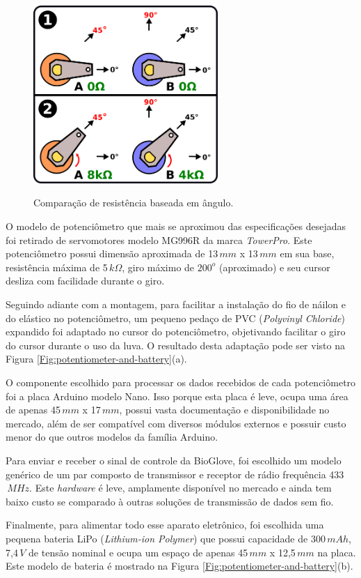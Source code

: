 \documentclass[
	12pt,				%
	openright,			%
	oneside,			%
	a4paper,			%
	english,			%
	brazil				%
	]{abntex2}
\begin{document}
		\begin{figure}[h!]
			\centering
			\caption{Comparação de resistência baseada em ângulo.}
  		\includegraphics[width=7cm]{./figures/pot-comparison.png}
  		\label{Fig:pot-comparison}
		\end{figure}
			
			O modelo de potenciômetro que mais se aproximou das especificações desejadas foi retirado de servomotores modelo MG996R da marca \textit{TowerPro}. Este potenciômetro possui dimensão aproximada de 13$\,mm$ x 13$\,mm$ em sua base, resistência máxima de 5$\,k\Omega$, giro máximo de $200^{o}$ (aproximado) e seu cursor desliza com facilidade durante o giro. 

			Seguindo adiante com a montagem, para facilitar a instalação do fio de náilon e do elástico no potenciômetro, um pequeno pedaço de PVC (\textit{Polyvinyl Chloride}) expandido foi adaptado no cursor do potenciômetro, objetivando facilitar o giro do cursor durante o uso da luva. O resultado desta adaptação pode ser visto na Figura \ref{Fig:potentiometer-and-battery}(a).

			O componente escolhido para processar os dados recebidos de cada potenciômetro foi a placa Arduino modelo Nano. Isso porque esta placa é leve, ocupa uma área de apenas 45$\,mm$ x 17$\,mm$, possui vasta documentação e disponibilidade no mercado, além de ser compatível com diversos módulos externos e possuir custo menor do que outros modelos da família Arduino.

			Para enviar e receber o sinal de controle da BioGlove, foi escolhido um modelo genérico de um par composto de transmissor e receptor de rádio frequência 433$\,MHz$. Este \textit{hardware} é leve, amplamente disponível no mercado e ainda tem baixo custo se comparado à outras soluções de transmissão de dados sem fio.

			Finalmente, para alimentar todo esse aparato eletrônico, foi escolhida uma pequena bateria LiPo (\textit{Lithium-ion Polymer}) que possui capacidade de 300$\,mAh$, 7,4$\,V$ de tensão nominal e ocupa um espaço de apenas 45$\,mm$ x 12,5$\,mm$ na placa. Este modelo de bateria é mostrado na Figura \ref{Fig:potentiometer-and-battery}(b).
\end{document}
